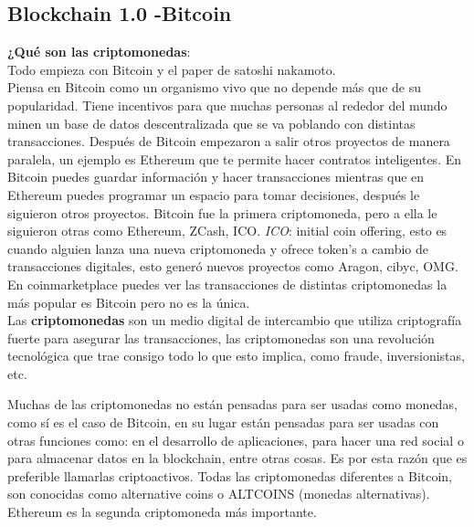 \documentclass[a4paper,12pt]{/home/armando/Documentos/Cursos/LaTeX/Plantillas/lib/pub}
\begin{document}
\subsection{Blockchain 1.0 -Bitcoin}
\textbf{¿Qué son las criptomonedas}:\\
Todo empieza con Bitcoin y el paper de satoshi nakamoto.\\
Piensa en Bitcoin como un organismo vivo que no depende más que de su popularidad. Tiene incentivos para que muchas personas al rededor del mundo minen un base de datos descentralizada que se va poblando con distintas transacciones.
Después de Bitcoin empezaron a salir otros proyectos de manera paralela, un ejemplo es Ethereum que te permite hacer contratos inteligentes.
En Bitcoin puedes guardar información y hacer transacciones mientras que en Ethereum puedes programar un espacio para tomar decisiones, después le siguieron otros proyectos.
Bitcoin fue la primera criptomoneda, pero a ella le siguieron otras como Ethereum, ZCash, ICO.
\textit{ICO}: initial coin offering, esto es cuando alguien lanza una nueva criptomoneda y ofrece token's a cambio de transacciones digitales, esto generó nuevos proyectos como Aragon, cibyc, OMG.
En coinmarketplace puedes ver las transacciones de distintas criptomonedas la más popular es Bitcoin pero no es la única.\\

Las \textbf{criptomonedas} son un medio digital de intercambio que utiliza criptografía fuerte para asegurar las transacciones, 
las criptomonedas son una revolución tecnológica que trae consigo todo lo que esto implica, como fraude, inversionistas, etc.

Muchas de las criptomonedas no están pensadas para ser usadas como monedas, como sí es el caso de Bitcoin, en su lugar están pensadas para ser usadas con otras funciones como: en el desarrollo de aplicaciones, para hacer una red social o para almacenar datos en la blockchain, entre otras cosas. Es por esta razón que es preferible llamarlas criptoactivos.
Todas las criptomonedas diferentes a Bitcoin, son conocidas como alternative coins o ALTCOINS (monedas alternativas).\\
Ethereum es la segunda criptomoneda más importante.
\end{document}
